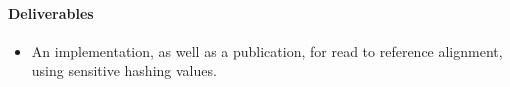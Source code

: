 





\paragraph{Deliverables}
\begin{itemize}
\item An implementation, as well as a publication, for read to reference alignment, using sensitive hashing values.
\end{itemize}


